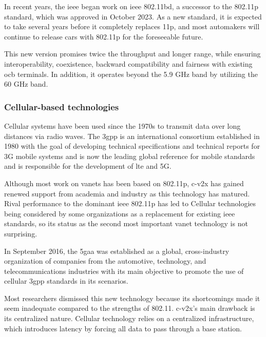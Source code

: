 In recent years, the \gls{ieee} began work on \gls{ieee} 802.11bd, a successor to the 802.11p standard, which was approved in October 2023\cite{noauthor_ieee_2023}. As a new standard, it is expected to take several years before it completely replaces 11p, and most automakers will continue to release cars with 802.11p for the foreseeable future.

This new version promises twice the throughput and longer range, while ensuring interoperability, coexistence, backward compatibility and fairness with existing \gls{ocb} terminals. In addition, it operates beyond the 5.9 GHz band by utilizing the 60 GHz band.


\subsubsection{Cellular-based technologies}
Cellular systems have been used since the 1970s to transmit data over long distances via radio waves\cite{anwer_survey_2014}. The \gls{3gpp} is an international consortium established in 1980 with the goal of developing technical specifications and technical reports for 3G mobile systems and is now the leading global reference for mobile standards and is responsible for the development of \gls{lte} and 5G\cite{noauthor_3gpp_nodate}.

Although most work on \glspl{vanet} has been based on 802.11p, \gls{c-v2x} has gained renewed support from academia and industry as this technology has matured\cite{gyawali_challenges_2021}. Rival performance to the dominant \gls{ieee} 802.11p has led to Cellular technologies being considered by some organizations as a replacement for existing \gls{ieee} standards, so its status as the second most important \gls{vanet} technology is not surprising.

In September 2016, the \gls{5gaa} was established as a global, cross-industry organization of companies from the automotive, technology, and telecommunications industries with its main objective to promote the use of cellular \gls{3gpp} standards in \gls{its} scenarios\cite{noauthor_5gaa_nodate}.

Most researchers dismissed this new technology because its shortcomings made it seem inadequate compared to the strengths of 802.11. \gls{c-v2x}'s main drawback is its centralized nature. Cellular technology relies on a centralized infrastructure, which introduces latency by forcing all data to pass through a base station.

